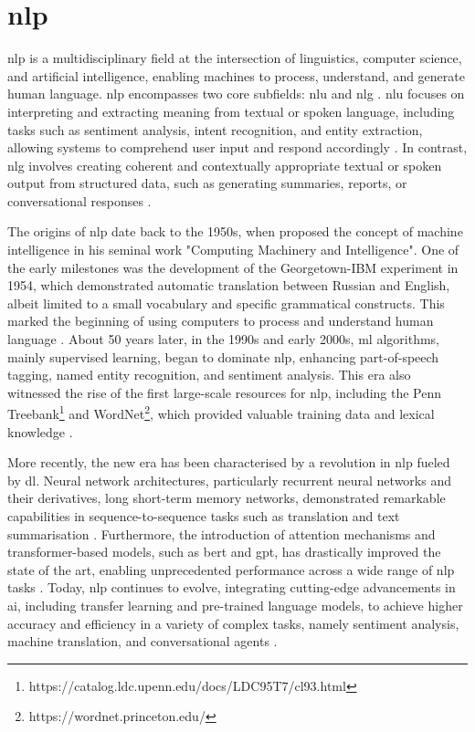 \section{\acl{nlp}} \label{subsec:nlp}

\ac{nlp} is a multidisciplinary field at the intersection of linguistics, computer science, and artificial intelligence, enabling machines to process, understand, and generate human language. \ac{nlp} encompasses two core subfields: \ac{nlu} and \ac{nlg} \cite{Khurana2023}. \ac{nlu} focuses on interpreting and extracting meaning from textual or spoken language, including tasks such as sentiment analysis, intent recognition, and entity extraction, allowing systems to comprehend user input and respond accordingly \cite{Khurana2023}. In contrast, \ac{nlg} involves creating coherent and contextually appropriate textual or spoken output from structured data, such as generating summaries, reports, or conversational responses \cite{Dong2021}.

The origins of \ac{nlp} date back to the 1950s, when  proposed the concept of machine intelligence in his seminal work "Computing Machinery and Intelligence". One of the early milestones was the development of the Georgetown-IBM experiment in 1954, which demonstrated automatic translation between Russian and English, albeit limited to a small vocabulary and specific grammatical constructs. This marked the beginning of using computers to process and understand human language \cite{Hutchins2004}. About 50 years later, in the 1990s and early 2000s, \ac{ml} algorithms, mainly supervised learning, began to dominate \ac{nlp}, enhancing part-of-speech tagging, named entity recognition, and sentiment analysis. This era also witnessed the rise of the first large-scale resources for \ac{nlp}, including the Penn Treebank\footnote{https://catalog.ldc.upenn.edu/docs/LDC95T7/cl93.html} and WordNet\footnote{https://wordnet.princeton.edu/}, which provided valuable training data and lexical knowledge \cite{Marcus1993, Fellbaum1998}.

More recently, the new era has been characterised by a revolution in \ac{nlp} fueled by \ac{dl}. Neural network architectures, particularly recurrent neural networks and their derivatives, long short-term memory networks, demonstrated remarkable capabilities in sequence-to-sequence tasks such as translation and text summarisation \cite{Bahdanau2015}. Furthermore, the introduction of attention mechanisms and transformer-based models, such as \ac{bert} and \ac{gpt}, has drastically improved the state of the art, enabling unprecedented performance across a wide range of \ac{nlp} tasks \cite{Vaswani2017, Devlin2019}. Today, \ac{nlp} continues to evolve, integrating cutting-edge advancements in \ac{ai}, including transfer learning and pre-trained language models, to achieve higher accuracy and efficiency in a variety of complex tasks, namely sentiment analysis, machine translation, and conversational agents \cite{Howard2018}.

